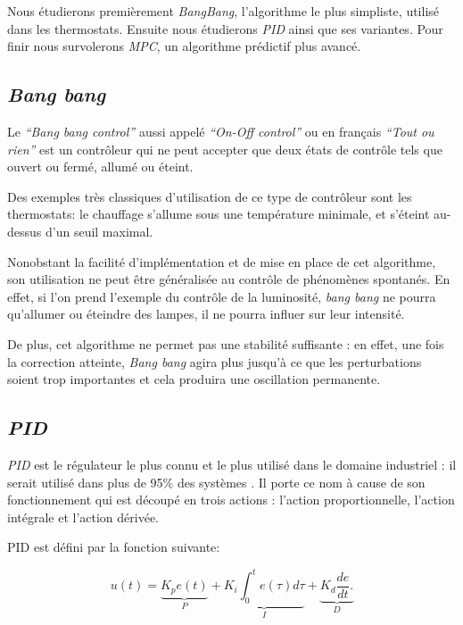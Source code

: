 \documentclass[a4paper,10pt]{report}
\begin{document}
Nous étudierons premièrement \emph{BangBang}, l'algorithme le plus simpliste, utilisé dans les thermostats.
Ensuite nous étudierons \emph{PID} ainsi que ses variantes.
Pour finir nous survolerons \emph{MPC}, un algorithme prédictif plus avancé.

\subsection{\emph{Bang bang}}
Le \emph{``Bang bang control''} aussi appelé \emph{``On-Off control''} ou en français \emph{``Tout ou rien''} est un contrôleur qui ne peut accepter que deux états de contrôle tels que ouvert ou fermé, allumé ou éteint.

Des exemples très classiques d'utilisation de ce type de contrôleur sont les thermostats: le chauffage s'allume sous une température minimale, et s'éteint au-dessus d'un seuil maximal.

Nonobstant la facilité d'implémentation et de mise en place de cet algorithme, son utilisation ne peut être généralisée au contrôle de phénomènes spontanés. En effet, si l'on prend l'exemple du contrôle de la luminosité, \emph{bang bang} ne pourra qu'allumer ou éteindre des lampes, il ne pourra influer sur leur intensité. \cite{Burghes2004}

De plus, cet algorithme ne permet pas une stabilité suffisante : en effet, une fois la correction atteinte, \emph{Bang bang} agira plus jusqu'à ce que les perturbations soient trop importantes et cela produira une oscillation permanente. \cite{ballard1993pid}


\subsection{\emph{PID}}
\label{PID}

\emph{PID} est le régulateur le plus connu et le plus utilisé dans le domaine industriel : il serait utilisé dans plus de 95\% des systèmes \cite{Kinnaert2013, aastrom2002control}.
Il porte ce nom à cause de son fonctionnement qui est découpé en trois actions : l'action proportionnelle, l'action intégrale et l'action dérivée.

PID est défini par la fonction suivante:

\begin{equation}
  u(t) =
    \underbrace{K_p e(t)}_{P} +
    \underbrace{K_i \int_{0}^{t} e(\tau) d\tau}_{I} +
    \underbrace{K_d \frac{de}{dt}.}_{D}
\end{equation}
\end{document}
